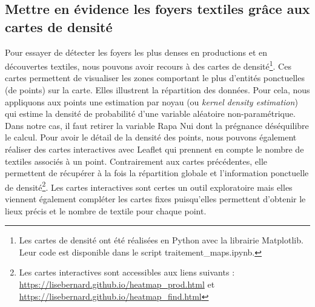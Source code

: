 \subsection{Mettre en évidence les foyers textiles grâce aux cartes de densité}

Pour essayer de détecter les foyers les plus denses en productions et en découvertes textiles, nous pouvons avoir recours à des cartes de densité\footnote{Les cartes de densité ont été réalisées en Python avec la librairie Matplotlib. Leur code est disponible dans le script traitement\_maps.ipynb.}. Ces cartes permettent de visualiser les zones comportant le plus d'entités ponctuelles (de points) sur la carte. Elles illustrent la répartition des données. Pour cela, nous appliquons aux points une estimation par noyau (ou \textit{kernel density estimation}) qui estime la densité de probabilité d'une variable aléatoire non-paramétrique. Dans notre cas, il faut retirer la variable \og Rapa Nui \fg \:dont la prégnance déséquilibre le calcul. Pour avoir le détail de la densité des points, nous pouvons également réaliser des cartes interactives avec Leaflet qui prennent en compte le nombre de textiles associés à un point. Contrairement aux cartes précédentes, elle permettent de récupérer à la fois la répartition globale et l'information ponctuelle de densité\footnote{Les cartes interactives sont accessibles aux liens suivants : \url{https://lisebernard.github.io/heatmap_prod.html} et \url{https://lisebernard.github.io/heatmap_find.html}}. Les cartes interactives sont certes un outil exploratoire mais elles viennent également compléter les cartes fixes puisqu'elles permettent d'obtenir le lieux précis et le nombre de textile pour chaque point.

